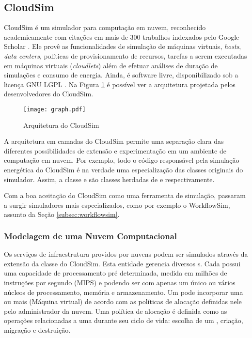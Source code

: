 \subsection{CloudSim}
CloudSim \cite{calheiros:cloudsim} é um simulador para computação em nuvem,
reconhecido academicamente com citações em mais de 300 trabalhos indexados
pelo Google Scholar \cite{google:cloudsim}. Ele provê as funcionalidades
de simulação de máquinas virtuais, \emph{hosts}, \emph{data centers}, políticas
de provisionamento de recursos, tarefas a serem executadas em máquinas virtuais
(\emph{cloudlets}) além de efetuar análises de duração de simulações e consumo
de energia. Ainda, é software livre, disponibilizado sob a licença GNU LGPL
\cite{cloudsim:site}. Na Figura \ref{fig:arquitetura_cloudsim} é possível ver a
arquitetura projetada pelos desenvolvedores do CloudSim. 

\begin{figure}[ht]
\centering
\texttt{[image: graph.pdf]}
\caption{Arquitetura do CloudSim}
\label{fig:arquitetura_cloudsim}
\end{figure}

A arquitetura em camadas do CloudSim permite uma separação clara das diferentes
possibilidades de extensão e experimentação em um ambiente de computação em nuvem.
Por exemplo, todo o código responsável pela simulação energética do CloudSim
é na verdade uma especialização das classes originais do simulador. Assim,
a classe  e  são classes herdadas de
 e  respectivamente.

Com a boa aceitação do CloudSim como uma ferramenta de simulação, passaram a 
surgir simuladores mais especializados, como por exemplo o WorkflowSim, assunto
da Seção \ref{subsec:workflowsim}.

\subsubsection{Modelagem de uma Nuvem Computacional}

Os serviços de infraestrutura providos por nuvens podem ser simulados através 
da extensão da classe  do CloudSim. Esta entidade gerencia
diversos s. Cada  possui uma capacidade de processamento 
pré determinada, medida em milhões de instruções por segundo (MIPS) e podendo 
ser com apenas um único ou vários núcleos de processamento, memória e
armazenamento. Um  pode incorporar uma ou mais  (Máquina virtual)
de acordo com as políticas de alocação definidas nele pelo administrador da nuvem.
Uma política de alocação é definida como as operações relacionadas a uma
 durante seu ciclo de vida: escolha de um , criação, 
migração e destruição.

